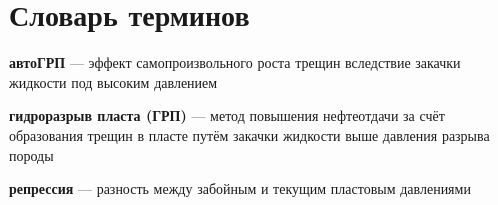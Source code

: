 \chapter*{Словарь терминов}             %

\textbf{автоГРП} --- эффект самопроизвольного роста трещин вследствие закачки жидкости под высоким давлением

\textbf{гидроразрыв пласта (ГРП)} --- метод повышения нефтеотдачи за счёт образования трещин в пласте путём закачки жидкости выше давления разрыва породы

\textbf{репрессия} --- разность между забойным и текущим пластовым давлениями
